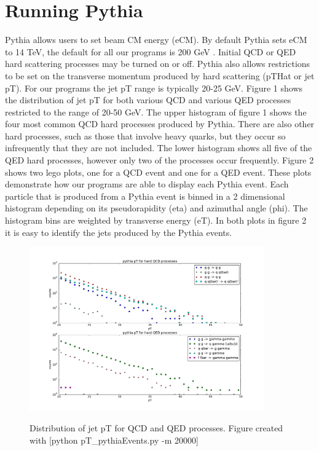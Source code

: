 \documentclass[11pt]{article}
\begin{document}
\section{Running Pythia}
%
%
Pythia allows users to set beam CM energy (eCM). By default Pythia sets eCM to 14 TeV, the default for all our programs is 200 GeV .  Initial QCD or QED hard scattering processes may be turned on or off. Pythia also allows restrictions to be set on the transverse momentum produced by hard scattering (pTHat or jet pT). For our programs the jet pT range is typically 20-25 GeV.
Figure 1 shows the distribution of jet pT for both various QCD and various QED processes restricted to the range of 20-50 GeV. The upper histogram of figure 1 shows the four most common QCD hard processes produced by Pythia. There are also other hard processes, such as those that involve heavy quarks, but they occur so infrequently that they are not included. The lower histogram shows all five of the QED hard processes, however only two of the processes occur frequently.
Figure 2 shows two lego plots, one for a QCD event and one for a QED event. These plots demonstrate how our programs are able to display each Pythia event. Each particle that is produced from a Pythia event is binned in a 2 dimensional histogram depending on its pseudorapidity (eta) and azimuthal angle (phi). The histogram bins are weighted by transverse energy (eT). In both plots in figure 2 it is easy to identify the jets produced by the Pythia events.

\begin{figure}[h]
\begin{center}
\includegraphics[width=0.9\textwidth]{pT_pythiaEvents.pdf}
\label{fig_label}
\caption{Distribution of jet pT for QCD and QED processes.  Figure created with [python pT\_pythiaEvents.py -m 20000]}
\end{center}
\end{figure}
\end{document}
